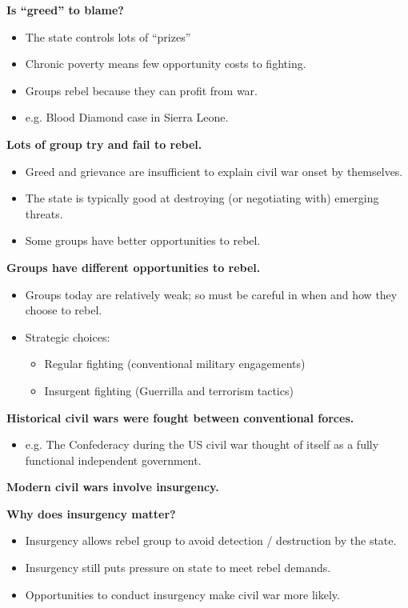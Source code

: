 \documentclass{article}
\begin{document}
{\bf Is ``greed'' to blame?}

\begin{itemize}
  \item The state controls lots of ``prizes''
  \item Chronic poverty means few opportunity costs to fighting.
  \item Groups rebel because they can profit from war.
  \item e.g. Blood Diamond case in Sierra Leone.
\end{itemize}

{\bf Lots of group try and fail to rebel.}

\begin{itemize}
  \item Greed and grievance are insufficient to explain civil war onset by themselves.
  \item The state is typically good at destroying (or negotiating with) emerging threats.
  \item Some groups have better opportunities to rebel.
\end{itemize}

{\bf Groups have different opportunities to rebel.}

\begin{itemize}
  \item Groups today are relatively weak; so must be careful in when and how they choose to rebel.
  \item Strategic choices:
    \begin{itemize}
      \item Regular fighting (conventional military engagements)
      \item Insurgent fighting (Guerrilla and terrorism tactics)
    \end{itemize}
\end{itemize}

{\bf Historical civil wars were fought between conventional forces.}

\begin{itemize}
  \item e.g. The Confederacy during the US civil war thought of itself as a fully functional independent government.
\end{itemize}

{\bf Modern civil wars involve insurgency.}

{\bf Why does insurgency matter?}

\begin{itemize}
  \item Insurgency allows rebel group to avoid detection / destruction by the state.
  \item Insurgency still puts pressure on state to meet rebel demands.
  \item Opportunities to conduct insurgency make civil war more likely.
\end{itemize}
\end{document}
